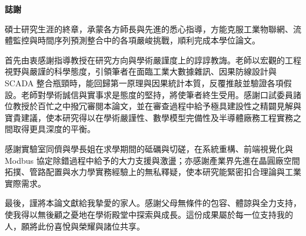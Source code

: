 \documentclass[fontset=none, a4paper, 12pt]{ctexart}
\begin{document}
\newpage
\begin{center}
{\fontsize{18}{22}\selectfont\bfseries 誌\hspace{2cm}謝\par}
\vspace{1.0cm}
\end{center}
{\fontsize{12}{20}\selectfont
碩士研究生涯的終章，承蒙各方師長與先進的悉心指導，方能克服工業物聯網、流體監控與時間序列預測整合中的各項嚴峻挑戰，順利完成本學位論文。

首先由衷感謝指導教授在研究方向與學術嚴謹度上的諄諄教誨。老師以宏觀的工程視野與嚴謹的科學態度，引領筆者在面臨工業大數據雜訊、因果防線設計與 SCADA 整合瓶頸時，能回歸第一原理與因果統計本質，反覆推敲並驗證各項假設。老師對學術誠信與實事求是態度的堅持，將使筆者終生受用。感謝口試委員諸位教授於百忙之中撥冗審閱本論文，並在審查過程中給予極具建設性之精闢見解與寶貴建議，使本研究得以在學術嚴謹性、數學模型完備性及半導體廠務工程實務之間取得更具深度的平衡。

感謝實驗室同儕與學長姐在求學期間的砥礪與切磋，在系統重構、前端視覺化與 Modbus 協定除錯過程中給予的大力支援與激盪；亦感謝產業界先進在晶圓廠空間拓撲、管路配置與水力學實務經驗上的無私釋疑，使本研究能緊密扣合理論與工業實際需求。

最後，謹將本論文獻給我摯愛的家人。感謝父母無條件的包容、體諒與全力支持，使我得以無後顧之憂地在學術殿堂中探索與成長。這份成果屬於每一位支持我的人，願將此份喜悅與榮耀與諸位共享。
\par}
\end{document}
